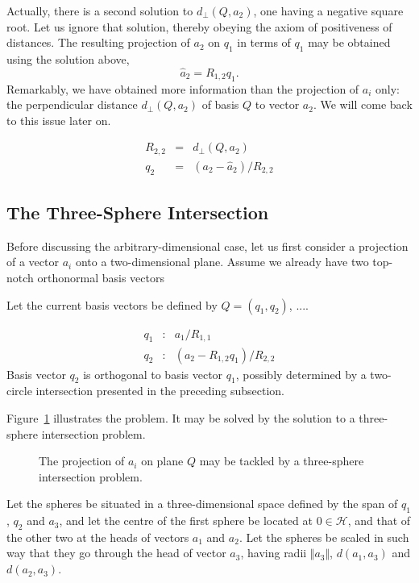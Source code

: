 \documentclass{article}
\newcommand{\sv}{Q}
\newcommand{\sve}{q}
\newcommand{\nonsve}{a}
\newcommand{\origin}{0}
\newcommand{\ce}{R}
\begin{document}
Actually, there is a second solution to $d_{\perp}(\sv,\nonsve_{2})$,
one having a negative square root. Let us ignore that solution, thereby
obeying the axiom of positiveness of distances. The resulting projection
of $\nonsve_{2}$ on $\sve_{1}$ in terms of $\sve_{1}$ may be obtained
using the solution above, \[
\hat{\nonsve}_{2}=\ce_{1,2}\sve_{1}.\]
Remarkably, we have obtained more information than the projection
of $\nonsve_{i}$ only: the perpendicular distance $d_{\perp}(\sv,\nonsve_{2})$
of basis $\sv$ to vector $\nonsve_{2}$. We will come back to this
issue later on.

\begin{eqnarray*}
\ce_{2,2} & = & d_{\perp}(\sv,\nonsve_{2})\\
\sve_{2} & = & (\nonsve_{2}-\hat{\nonsve}_{2})/\ce_{2,2}\end{eqnarray*}



\subsection{The Three-Sphere Intersection\label{subsection:three_sphere_intersection}}

Before discussing the arbitrary-dimensional case, let us first consider
a projection of a vector $\nonsve_{i}$ onto a two-dimensional plane.
Assume we already have two top-notch orthonormal basis vectors 

Let the current basis vectors be defined by $\sv=(\sve_{1},\sve_{2})$,
.... 

\begin{eqnarray*}
\sve_{1} & : & \nonsve_{1}/\ce_{1,1}\\
\sve_{2} & : & (\nonsve_{2}-\ce_{1,2}\sve_{1})/\ce_{2,2}\end{eqnarray*}
Basis vector $\sve_{2}$ is orthogonal to basis vector $\sve_{1}$,
possibly determined by a two-circle intersection presented in the
preceding subsection. 

Figure~\ref{figure:three_sphere_intersection} illustrates the problem.
It may be solved by the solution to a three-sphere intersection problem.
%
\begin{figure}
\begin{center}\end{center}


\caption{The projection of $\nonsve_{i}$ on plane $\sv$ may be tackled by
a three-sphere intersection problem.\label{figure:three_sphere_intersection}}
\end{figure}
 Let the spheres be situated in a three-dimensional space defined
by the span of $\sve_{1}$, $\sve_{2}$ and $\nonsve_{3}$, and let
the centre of the first sphere be located at $\origin\in\mathcal{H}$,
and that of the other two at the heads of vectors $\nonsve_{1}$ and
$\nonsve_{2}$. Let the spheres be scaled in such way that they go
through the head of vector $\nonsve_{3}$, having radii $\Vert\nonsve_{3}\Vert$,
$d(\nonsve_{1},\nonsve_{3})$ and $d(\nonsve_{2},\nonsve_{3})$. 
\end{document}
